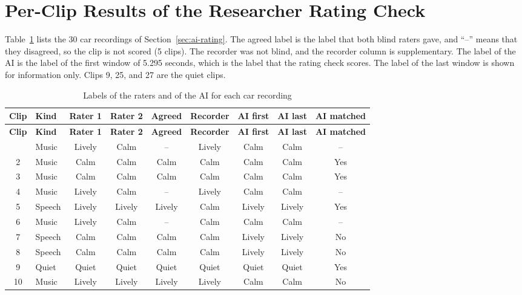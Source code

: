 \section*{Per-Clip Results of the Researcher Rating Check}
Table~\ref{tab:ai-clips} lists the 30 car recordings of Section~\ref{sec:ai-rating}. The agreed label is the label that both blind raters gave, and ``--'' means that they disagreed, so the clip is not scored (5 clips). The recorder was not blind, and the recorder column is supplementary. The label of the AI is the label of the first window of 5.295 seconds, which is the label that the rating check scores. The label of the last window is shown for information only. Clips 9, 25, and 27 are the quiet clips.

{
\footnotesize
\setlength{\tabcolsep}{4pt}
\renewcommand{\arraystretch}{1.15}
\begin{longtable}{|c|l|c|c|c|c|c|c|c|}
\caption{Labels of the raters and of the AI for each car recording}\label{tab:ai-clips}\\
\hline
\textbf{Clip} & \textbf{Kind} & \textbf{Rater 1} & \textbf{Rater 2} & \textbf{Agreed} & \textbf{Recorder} & \textbf{AI first} & \textbf{AI last} & \textbf{AI matched} \\
\hline
\endfirsthead
\hline
\textbf{Clip} & \textbf{Kind} & \textbf{Rater 1} & \textbf{Rater 2} & \textbf{Agreed} & \textbf{Recorder} & \textbf{AI first} & \textbf{AI last} & \textbf{AI matched} \\
\hline
\endhead
\endfoot
1 & Music & Lively & Calm & -- & Lively & Calm & Calm & -- \\
\hline
2 & Music & Calm & Calm & Calm & Calm & Calm & Calm & Yes \\
\hline
3 & Music & Calm & Calm & Calm & Calm & Calm & Calm & Yes \\
\hline
4 & Music & Lively & Calm & -- & Lively & Calm & Calm & -- \\
\hline
5 & Speech & Lively & Lively & Lively & Calm & Lively & Lively & Yes \\
\hline
6 & Music & Lively & Calm & -- & Calm & Calm & Calm & -- \\
\hline
7 & Speech & Calm & Calm & Calm & Calm & Lively & Lively & No \\
\hline
8 & Speech & Calm & Calm & Calm & Calm & Lively & Lively & No \\
\hline
9 & Quiet & Quiet & Quiet & Quiet & Quiet & Quiet & Quiet & Yes \\
\hline
10 & Music & Lively & Lively & Lively & Lively & Calm & Calm & No \\

\end{longtable}}
